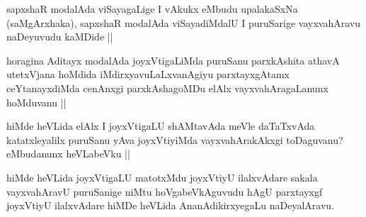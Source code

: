 \begin{artha}
sapxshaR modalAda viSayagaLige I vAkukx eMbudu upalakaSxNa (saMgArxhaka), sapxshaR modalAda viSayadiMdalU I puruSarige vayxvahAravu naDeyuvudu kaMDide ||
\end{artha}

\begin{artha}
horagina Aditayx modalAda joyxVtigaLiMda puruSanu parxkAshita athavA utetxVjana hoMdida iMdirxyavuLaLxvanAgiyu parxtayxgAtamx ceYtanayxdiMda cenAnxgi parxkAshagoMDu elAlx vayxvahAragaLanunx hoMduvanu ||
\end{artha}

\begin{artha}
hiMde heVLida elAlx I joyxVtigaLU shAMtavAda meVle daTaTxvAda katatxleyalilx puruSanu yAva joyxVtiyiMda vayxvahArakAkxgi toDaguvanu? eMbudanunx heVLabeVku ||
\end{artha}

\begin{artha}
hiMde heVLida joyxVtigaLU matotxMdu joyxVtiyU ilalxvAdare sakala vayxvahAravU puruSanige niMtu hoVgabeVkAguvudu hAgU parxtayxgf joyxVtiyU ilalxvAdare hiMDe heVLida AnanAdikirxyegaLu naDeyalAravu.
\end{artha}

\begin{artha}

\end{artha}

\begin{artha}

\end{artha}

\begin{artha}

\end{artha}

\begin{artha}

\end{artha}

\begin{artha}

\end{artha}

\begin{artha}

\end{artha}

\begin{artha}

\end{artha}

